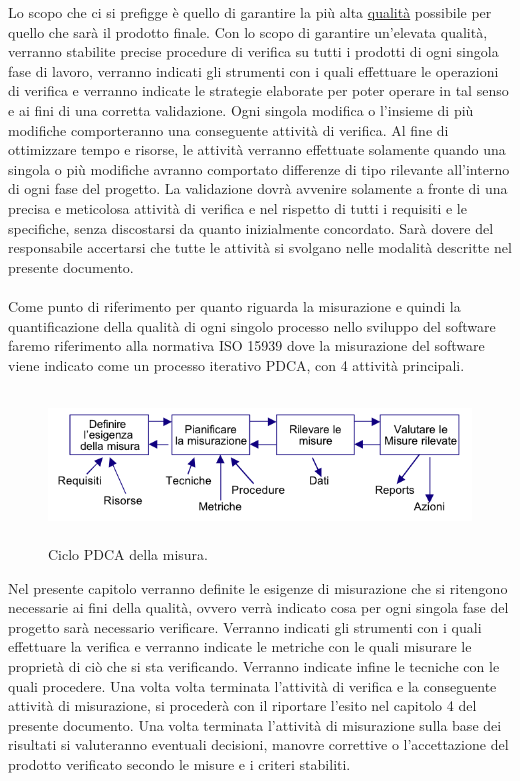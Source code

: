 Lo scopo che ci si prefigge \`e quello di garantire la pi\`u alta
\underline{qualit\`a} possibile per quello che sar\`a il prodotto finale. Con lo
scopo di garantire un'elevata qualit\`a, verranno stabilite precise procedure di
verifica su tutti i prodotti di ogni singola fase di lavoro, verranno indicati
gli strumenti con i quali effettuare le operazioni di verifica e verranno
indicate le strategie elaborate per poter operare in tal senso e ai fini di una
corretta validazione. Ogni singola modifica o l'insieme di pi\`u modifiche
comporteranno una conseguente attivit\`a di verifica. Al fine di
ottimizzare tempo e risorse, le attivit\`a verranno effettuate solamente quando
una singola o pi\`u modifiche avranno comportato differenze di tipo rilevante
all'interno di ogni fase del progetto. La validazione dovr\`a avvenire
solamente a fronte di una precisa e meticolosa attivit\`a di verifica e nel
rispetto di tutti i requisiti e le specifiche, senza discostarsi da
quanto inizialmente concordato. Sar\`a dovere del responsabile accertarsi che
tutte le attivit\`a si svolgano nelle modalit\`a descritte nel presente documento.
\\
\\ 
Come punto di riferimento per quanto riguarda la misurazione e quindi la
quantificazione della qualit\`a di ogni singolo processo nello sviluppo del
software faremo riferimento alla normativa ISO 15939 dove la misurazione del
software viene indicato come un processo iterativo PDCA, con 4 attivit\`a
principali.

\begin{figure}[h]
  \centering
  \includegraphics[height=4cm]{img/pdca.png}
\caption{Ciclo PDCA della misura.}
\end{figure}

Nel presente capitolo verranno definite le esigenze di misurazione che si
ritengono necessarie ai fini della qualit\`a, ovvero verr\`a indicato cosa per ogni
singola fase del progetto sar\`a necessario verificare. Verranno indicati gli
strumenti con i quali effettuare la verifica e verranno indicate le metriche con
le quali misurare le propriet\`a di ci\`o che si sta verificando. Verranno indicate
infine le tecniche con le quali procedere. Una volta volta terminata l'attivit\`a
di verifica e la conseguente attivit\`a di misurazione, si proceder\`a con il
riportare l'esito nel capitolo 4 del presente documento. Una volta terminata
l'attivit\`a di misurazione sulla base dei risultati si valuteranno eventuali
decisioni, manovre correttive o l'accettazione del prodotto verificato secondo
le misure e i criteri stabiliti.


